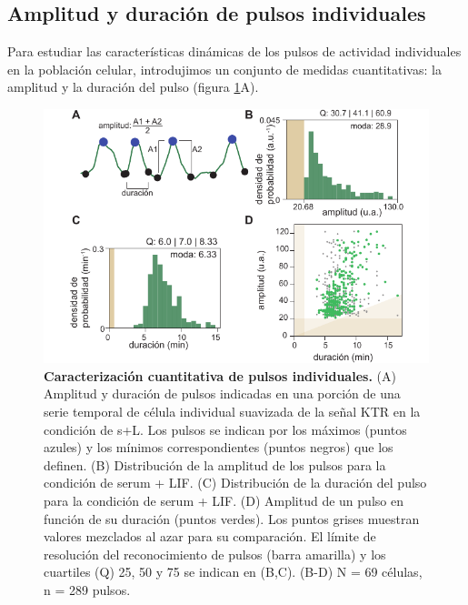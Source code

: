 \documentclass[./main.tex]{subfiles}
\begin{document}
\subsection{Amplitud y duración de pulsos individuales}

Para estudiar las características dinámicas de los pulsos de actividad individuales en la población celular, introdujimos un conjunto de medidas cuantitativas: la amplitud y la duración del pulso (figura \ref{C2_fig:amp_durac}A). 

 \begin{figure}
    \centering
    \includegraphics[width=1\columnwidth]{figures/chapter2/C2_amp_durac.pdf}\caption{\textbf{Caracterización cuantitativa de pulsos individuales.} (A) Amplitud y duración de pulsos indicadas en una porción de una serie temporal de célula individual suavizada de la señal KTR en la condición de s+L. Los pulsos se indican por los máximos (puntos azules) y los mínimos correspondientes (puntos negros) que los definen. (B) Distribución de la amplitud de los pulsos para la condición de serum + LIF. (C) Distribución de la duración del pulso para la condición de serum + LIF. (D) Amplitud de un pulso en función de su duración (puntos verdes). Los puntos grises muestran valores mezclados al azar para su comparación. El límite de resolución del reconocimiento de pulsos (barra amarilla) y los cuartiles (Q) 25, 50 y 75 se indican en (B,C). (B-D) N = 69 células, n = 289 pulsos.}
    \label{C2_fig:amp_durac}
\end{figure}
\end{document}
